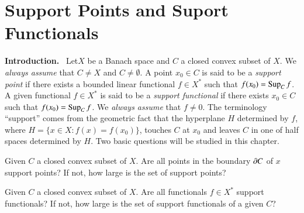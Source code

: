 \chapter{Support Points and Suport Functionals}\label{chap7}

{\bf Introduction.}~ Let\pageoriginale $X$ be a Banach space and $C$ a
closed convex subset of $X$. We {\em always assume} that $C\neq X$ and
$C\neq \emptyset$. A point $x_{0}\in C$ is said to be a {\em support
  point} if there exists a bounded linear functional $f\in X^{*}$ such
that $f(x_{0})=\operatorname{Sup}_{C}f$. A given functional $f\in X^{*}$ is said to
be a {\em support functional} if there exists $x_{0}\in C$ such that
$f(x_{0})=\operatorname{Sup}_{C}f$. We {\em always assume} that $f\neq 0$. The
terminology ``support'' comes from the geometric fact that the
hyperplane $H$ determined by $f$, where $H=\{x\in X:f(x)=f(x_{0})\}$,
touches $C$ at $x_{0}$ and leaves $C$ in one of half spaces determined
by $H$. Two basic questions will be studied in this chapter. 

\begin{problem}\label{chap7-prob1}
Given $C$ a closed convex subset of $X$. Are all points in the
boundary $\partial C$ of $x$ support points? If not, how large is the set of
support points?
\end{problem}

\begin{problem}\label{chap7-prob2}
Given $C$ a closed convex subset of $X$. Are all functionals $f\in
X^{*}$ support functionals? If not, how large is the set of support
functionals of a given $C$?
\end{problem}

